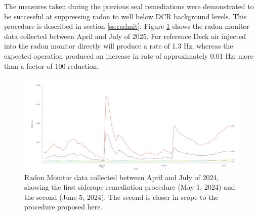 \documentclass[11pt]{article}
\begin{document}
The measures taken during the previous seal remediations were demonstrated to be successful at suppressing radon to well below DCR background levels. This procedure is described in section \ref{ss:radmit}. Figure \ref{fig:radmon} shows the radon monitor data collected between April and July of 2025. For reference Deck air injected into the radon monitor directly will produce a rate of 1.3 Hz, whereas the expected operation produced an increase in rate of approximately 0.01 Hz; more than a factor of 100 reduction.

\begin{figure}
  \begin{center}
    \includegraphics[width=\textwidth]{RadonMonitorDataAprilJuly2025}
  \end{center}
  \caption{Radon Monitor data collected between April and July of 2024, showing the first siderope remediation procedure (May 1, 2024) and the second (June 5, 2024). The second is closer in scope to the procedure proposed here.}
  \label{fig:radmon}
\end{figure}
\end{document}
